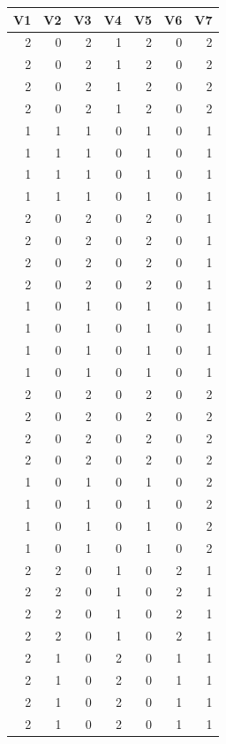\documentclass[
  12pt,
]{krantz}
\begin{document}
\begin{tabular}{r|r|r|r|r|r|r}
\hline
V1 & V2 & V3 & V4 & V5 & V6 & V7\\
\hline
2 & 0 & 2 & 1 & 2 & 0 & 2\\
\hline
2 & 0 & 2 & 1 & 2 & 0 & 2\\
\hline
2 & 0 & 2 & 1 & 2 & 0 & 2\\
\hline
2 & 0 & 2 & 1 & 2 & 0 & 2\\
\hline
1 & 1 & 1 & 0 & 1 & 0 & 1\\
\hline
1 & 1 & 1 & 0 & 1 & 0 & 1\\
\hline
1 & 1 & 1 & 0 & 1 & 0 & 1\\
\hline
1 & 1 & 1 & 0 & 1 & 0 & 1\\
\hline
2 & 0 & 2 & 0 & 2 & 0 & 1\\
\hline
2 & 0 & 2 & 0 & 2 & 0 & 1\\
\hline
2 & 0 & 2 & 0 & 2 & 0 & 1\\
\hline
2 & 0 & 2 & 0 & 2 & 0 & 1\\
\hline
1 & 0 & 1 & 0 & 1 & 0 & 1\\
\hline
1 & 0 & 1 & 0 & 1 & 0 & 1\\
\hline
1 & 0 & 1 & 0 & 1 & 0 & 1\\
\hline
1 & 0 & 1 & 0 & 1 & 0 & 1\\
\hline
2 & 0 & 2 & 0 & 2 & 0 & 2\\
\hline
2 & 0 & 2 & 0 & 2 & 0 & 2\\
\hline
2 & 0 & 2 & 0 & 2 & 0 & 2\\
\hline
2 & 0 & 2 & 0 & 2 & 0 & 2\\
\hline
1 & 0 & 1 & 0 & 1 & 0 & 2\\
\hline
1 & 0 & 1 & 0 & 1 & 0 & 2\\
\hline
1 & 0 & 1 & 0 & 1 & 0 & 2\\
\hline
1 & 0 & 1 & 0 & 1 & 0 & 2\\
\hline
2 & 2 & 0 & 1 & 0 & 2 & 1\\
\hline
2 & 2 & 0 & 1 & 0 & 2 & 1\\
\hline
2 & 2 & 0 & 1 & 0 & 2 & 1\\
\hline
2 & 2 & 0 & 1 & 0 & 2 & 1\\
\hline
2 & 1 & 0 & 2 & 0 & 1 & 1\\
\hline
2 & 1 & 0 & 2 & 0 & 1 & 1\\
\hline
2 & 1 & 0 & 2 & 0 & 1 & 1\\
\hline
2 & 1 & 0 & 2 & 0 & 1 & 1\\
\hline
\end{tabular}
\end{document}
